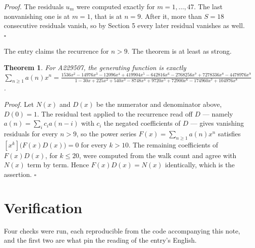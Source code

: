 \documentclass[11pt]{article}
\newtheorem{theorem}{Theorem}
\theoremstyle{definition}
\begin{document}
{\itshape Proof.} The residuals $u_m$ were computed exactly for $m = 1,\dots,47$. The last nonvanishing one is at $m = 1$, that is at $n = 9$. After it, more than $S = 18$ consecutive residuals vanish, so by Section 5 every later residual vanishes as well. $\square$

The entry claims the recurrence for $n > 9$. The theorem is at least as strong.

\begin{theorem} For A229507, the generating function is exactly $\sum_{n\ge 1} a(n)x^n = \frac{1536x^{2} - 14976x^{3} - 12096x^{4} + 419904x^{5} - 642816x^{6} - 2768256x^{7} + 7278336x^{8} - 4478976x^{9}}{1 - 30x + 225x^{2} + 540x^{3} - 8748x^{4} + 9720x^{5} + 72900x^{6} - 174960x^{7} + 104976x^{8}}$.\end{theorem}

{\itshape Proof.} Let $N(x)$ and $D(x)$ be the numerator and denominator above, $D(0)=1$. The residual test applied to the recurrence read off $D$ --- namely $a(n) = \sum_i c_i a(n-i)$ with $c_i$ the negated coefficients of $D$ --- gives vanishing residuals for every $n > 9$, so the power series $F(x)=\sum_{n\ge 1}a(n)x^n$ satisfies $[x^k]\bigl(F(x)D(x)\bigr) = 0$ for every $k > 10$. The remaining coefficients of $F(x)D(x)$, for $k \le 20$, were computed from the walk count and agree with $N(x)$ term by term. Hence $F(x)D(x) = N(x)$ identically, which is the assertion. $\square$

\section{Verification}

Four checks were run, each reproducible from the code accompanying this note, and the first two are what pin the reading of the entry's English.
\end{document}
